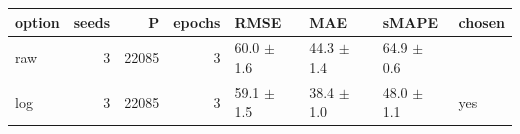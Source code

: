 \begin{tabular}{lrrrllll}
\toprule
option & seeds & P & epochs & RMSE & MAE & sMAPE & chosen \\
\midrule
raw & 3 & 22085 & 3 & 60.0 $\pm$ 1.6 & 44.3 $\pm$ 1.4 & 64.9 $\pm$ 0.6 &  \\
log & 3 & 22085 & 3 & 59.1 $\pm$ 1.5 & 38.4 $\pm$ 1.0 & 48.0 $\pm$ 1.1 & yes \\
\bottomrule
\end{tabular}
